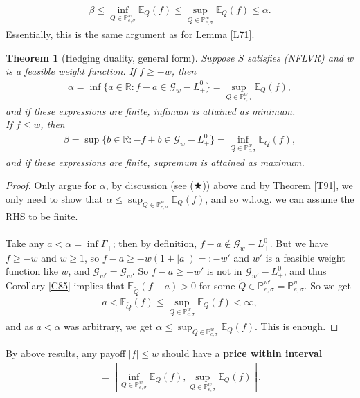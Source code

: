 \documentclass[12pt,a4paper, twoside]{article}
\newtheorem{thm}{Theorem}[section]
\theoremstyle{definition}
\newcommand{\EE}{\mathbb{E}} %
\newcommand{\PP}{\mathbb{P}} %
\begin{document}
\begin{align*}
\beta \leq \inf_{Q \in \PP_{e, \sigma}^w} \EE_Q(f) \leq \sup_{Q \in \PP_{e, \sigma}^w}\EE_Q(f) \leq \alpha. \tag{$\bigstar$}
\end{align*}
Essentially, this is the same argument as for Lemma \ref{L71}. 
\begin{thm}[Hedging duality, general form] \label{T92} Suppose $S$ satisfies (NFLVR) and $w$ is a feasible weight function. If $f \geq -w$, then 
\begin{align*} \label{91}
\alpha = \inf \{ a \in \mathbb{R}: f-a \in \mathcal{G}_w-L_+^0 \} = \sup_{Q \in \PP_{e, \sigma}^w} \EE_Q(f), \tag{9.1}
\end{align*}
and if these expressions are finite, infimum is attained as minimum. \\
If $f \leq w$, then 
\begin{align*}
\beta = \sup\{ b \in \mathbb{R}: -f+b \in \mathcal{G}_w-L_+^0\} = \inf_{Q \in \PP_{e, \sigma}^w} \EE_Q(f),
\end{align*}
and if these expressions are finite, supremum is attained as maximum. 
\end{thm}
\begin{proof}
Only argue for $\alpha$, by discussion (see ($\bigstar$)) above and by Theorem \ref{T91}, we only need to show that $\alpha \leq \sup_{Q \in \PP_{e,  \sigma}^w} \EE_Q(f)$, and so w.l.o.g. we can assume the RHS to be finite. \\
\\
Take any $a< \alpha = \inf \Gamma_+$; then by definition, $f-a \notin \mathcal{G}_w-L_+^0$. But we have $f \geq -w$ and $w \geq 1$, so $f-a \geq -w(1+|a|)=:-w'$ and $w'$ is a feasible weight function like $w$, and $\mathcal{G}_{w'}= \mathcal{G}_{w}$. So $f-a \geq -w' $ is not in $\mathcal{G}_{w'}-L_+^0$, and thus Corollary \ref{C85} implies that $\EE_{\widetilde{Q}}(f-a) >0$ for some $\widetilde{Q} \in \PP_{e, \sigma}^{w'} = \PP_{e, \sigma}^w$. So we get 
\begin{align*}
a < \EE_{ \widetilde{Q}}(f) \leq \sup_{Q \in \PP_{e, \sigma}^w } \EE_Q(f) < \infty,
\end{align*}
and as $a < \alpha$ was arbitrary, we get $\alpha \leq \sup_{Q \in \PP_{e, \sigma}^w} \EE_Q(f)$. This is enough. 
\end{proof}
By above results, any payoff $|f| \leq w$ should have a \textbf{price within interval}
\begin{align*}
[\beta, \alpha ] = \left[  \inf_{Q \in \PP_{e, \sigma}^w} \EE_Q(f), \sup_{Q \in \PP_{e, \sigma}^w } \EE_Q(f) \right].
\end{align*} 
\end{document}
